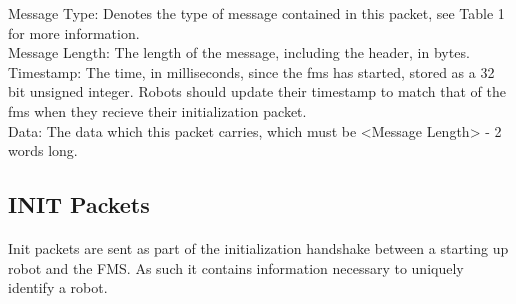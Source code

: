 \documentclass[11pt]{article}
\begin{document}
Message Type: Denotes the type of message contained in this packet, see Table 1 for more information.\\
Message Length: The length of the message, including the header, in bytes.
Timestamp: The time, in milliseconds, since the \acrshort{fms} has started, stored as a 32 bit unsigned integer.
Robots should update their timestamp to match that of the \acrshort{fms} when they recieve their initialization packet.\\
Data: The data which this packet carries, which must be <Message Length> - 2 words long.\\

\subsection {INIT Packets}
\paragraph{}
Init packets are sent as part of the initialization handshake between a starting up robot and the FMS.  
As such it contains information necessary to uniquely identify a robot.  
\newline
\end{document}
